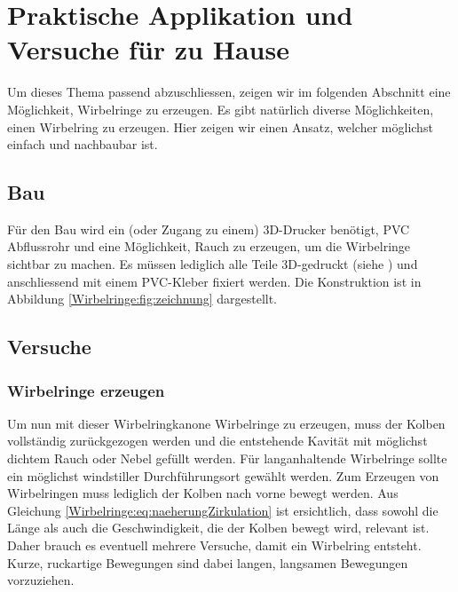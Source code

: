 %
%
%
\section{Praktische Applikation und Versuche für zu Hause}
%
Um dieses Thema passend abzuschliessen, zeigen wir im folgenden Abschnitt eine Möglichkeit, Wirbelringe zu erzeugen.
Es gibt natürlich diverse Möglichkeiten, einen Wirbelring zu erzeugen. 
Hier zeigen wir einen Ansatz, welcher möglichst einfach und nachbaubar ist.

\subsection{Bau}


Für den Bau wird ein (oder Zugang zu einem) 3D-Drucker benötigt,  PVC Abflussrohr und eine Möglichkeit, Rauch zu erzeugen, um die Wirbelringe sichtbar zu machen. 
%
Es müssen lediglich alle Teile 3D-gedruckt (siehe \cite{Wirbelringe:3D_modelle}) und anschliessend mit einem PVC-Kleber fixiert werden. 
Die Konstruktion ist in Abbildung \ref{Wirbelringe:fig:zeichnung} dargestellt.

\subsection{Versuche}

\subsubsection{Wirbelringe erzeugen\label{Wirbelringe:wirbelringeerzeugen}}

Um nun mit dieser Wirbelringkanone Wirbelringe zu erzeugen, muss der Kolben vollständig zurückgezogen werden und die entstehende Kavität mit möglichst dichtem Rauch oder Nebel gefüllt werden.
%
Für langanhaltende Wirbelringe sollte ein möglichst windstiller Durchführungsort gewählt werden.
Zum Erzeugen von Wirbelringen muss lediglich der Kolben nach vorne bewegt werden.
Aus Gleichung \eqref{Wirbelringe:eq:naeherungZirkulation} ist ersichtlich, dass sowohl die Länge als auch die Geschwindigkeit, die der Kolben bewegt wird, relevant ist.
Daher brauch es eventuell mehrere Versuche, damit ein Wirbelring entsteht.
Kurze, ruckartige Bewegungen sind dabei langen, langsamen Bewegungen vorzuziehen.

